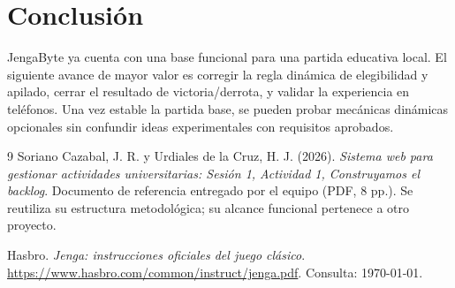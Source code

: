 \documentclass[11pt,letterpaper]{article}
\begin{document}
\section{Conclusión}

JengaByte ya cuenta con una base funcional para una partida educativa local. El siguiente avance de mayor valor es corregir la regla dinámica de elegibilidad y apilado, cerrar el resultado de victoria/derrota, y validar la experiencia en teléfonos. Una vez estable la partida base, se pueden probar mecánicas dinámicas opcionales sin confundir ideas experimentales con requisitos aprobados.

\begin{thebibliography}{9}
Soriano Cazabal, J. R. y Urdiales de la Cruz, H. J. (2026).
\emph{Sistema web para gestionar actividades universitarias: Sesión 1, Actividad 1, Construyamos el backlog}. Documento de referencia entregado por el equipo (PDF, 8 pp.). Se reutiliza su estructura metodológica; su alcance funcional pertenece a otro proyecto.

Hasbro. \emph{Jenga: instrucciones oficiales del juego clásico}.
\url{https://www.hasbro.com/common/instruct/jenga.pdf}. Consulta: \today.
\end{thebibliography}
\end{document}
